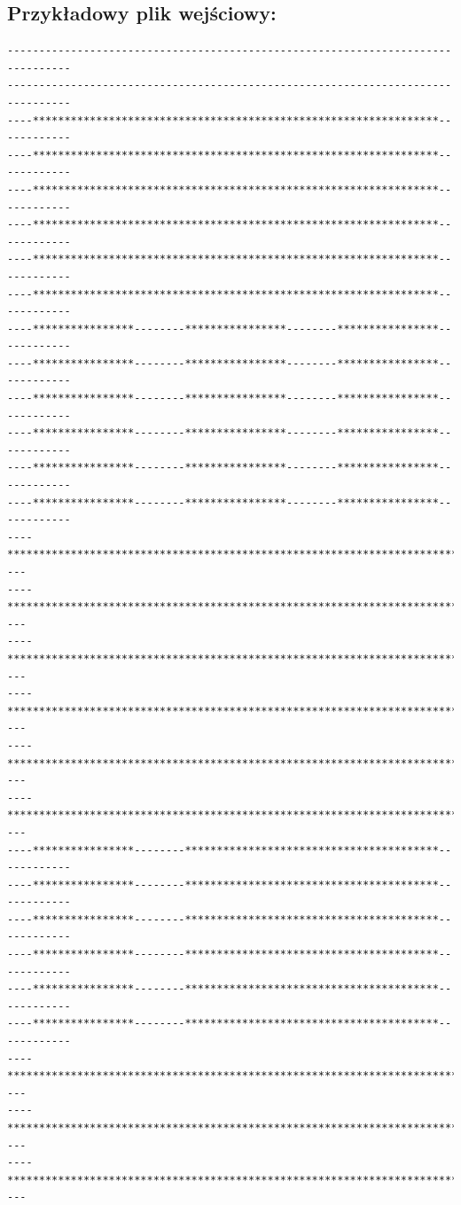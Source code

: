 \documentclass[a4paper]{article}
\begin{document}
\subsection*{Przykładowy plik wejściowy:}
\begin{verbatim}
--------------------------------------------------------------------------------
--------------------------------------------------------------------------------
----****************************************************************------------
----****************************************************************------------
----****************************************************************------------
----****************************************************************------------
----****************************************************************------------
----****************************************************************------------
----****************--------****************--------****************------------
----****************--------****************--------****************------------
----****************--------****************--------****************------------
----****************--------****************--------****************------------
----****************--------****************--------****************------------
----****************--------****************--------****************------------
----************************************************************************----
----************************************************************************----
----************************************************************************----
----************************************************************************----
----************************************************************************----
----************************************************************************----
----****************--------****************************************------------
----****************--------****************************************------------
----****************--------****************************************------------
----****************--------****************************************------------
----****************--------****************************************------------
----****************--------****************************************------------
----************************************************************************----
----************************************************************************----
----************************************************************************----

\end{verbatim}
\end{document}
